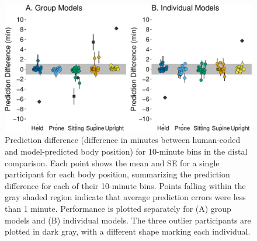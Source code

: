\documentclass[
  man]{apa6}
\begin{document}
\begin{figure}

{\centering \includegraphics{manuscript_files/figure-latex/part2bins-1} 

}

\caption{Prediction difference (difference in minutes between human-coded and model-predicted body position) for 10-minute bins in the distal comparison. Each point shows the mean and SE for a single participant for each body position, summarizing the prediction difference for each of their 10-minute bins. Points falling within the gray shaded region indicate that average prediction errors were less than 1 minute. Performance is plotted separately for (A) group models and (B) individual models. The three outlier participants are plotted in dark gray, with a different shape marking each individual.}\label{fig:part2bins}
\end{figure}
\end{document}
